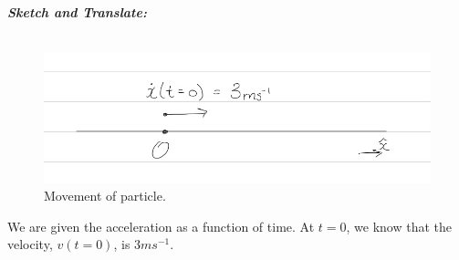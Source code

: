 %
%
%


\begin{subquestions}
	
\subquestion

\begin{subsubquestions}
	
\subsubquestion

\textbf{\textit{Sketch and Translate:}} \\ \\
\begin{figure}[H]
	\begin{center}
		\includegraphics[scale=0.25]{../2009/figures/2009q6-1}
		\caption{\label{2009:q6:Sketch1} Movement of particle.}
	\end{center}
\end{figure}
We are given the acceleration as a function of time. At $t=0$, we know that the velocity, $v(t=0)$, is $3ms^{-1}$.
	
	
	

\end{subsubquestions}
\end{subquestions}
